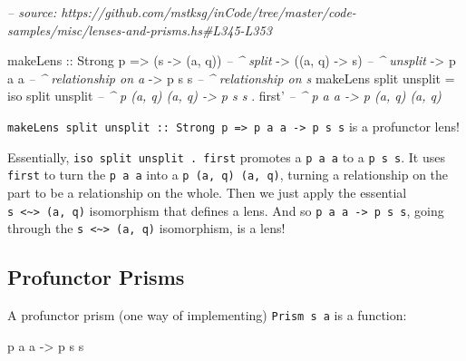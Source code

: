 \documentclass[]{article}
\newenvironment{Shaded}{}{}
\newcommand{\CommentTok}[1]{\textcolor[rgb]{0.38,0.63,0.69}{\textit{#1}}}
\newcommand{\DataTypeTok}[1]{\textcolor[rgb]{0.56,0.13,0.00}{#1}}
\newcommand{\FunctionTok}[1]{\textcolor[rgb]{0.02,0.16,0.49}{#1}}
\newcommand{\NormalTok}[1]{#1}
\newcommand{\OtherTok}[1]{\textcolor[rgb]{0.00,0.44,0.13}{#1}}
\begin{document}
\begin{Shaded}
\begin{Highlighting}[]
\CommentTok{-- source: https://github.com/mstksg/inCode/tree/master/code-samples/misc/lenses-and-prisms.hs#L345-L353}

\NormalTok{makeLens}
\OtherTok{    ::} \DataTypeTok{Strong}\NormalTok{ p}
    \OtherTok{=>}\NormalTok{ (s }\OtherTok{->}\NormalTok{ (a, q))        }\CommentTok{-- ^ split}
    \OtherTok{->}\NormalTok{ ((a, q) }\OtherTok{->}\NormalTok{ s)        }\CommentTok{-- ^ unsplit}
    \OtherTok{->}\NormalTok{ p a a                }\CommentTok{-- ^ relationship on a}
    \OtherTok{->}\NormalTok{ p s s                }\CommentTok{-- ^ relationship on s}
\NormalTok{makeLens split unsplit }\FunctionTok{=}
\NormalTok{    iso split unsplit  }\CommentTok{-- ^ p (a, q) (a, q) -> p s s}
  \FunctionTok{.}\NormalTok{ first'             }\CommentTok{-- ^ p a a -> p (a, q) (a, q)}
\end{Highlighting}
\end{Shaded}

\texttt{makeLens\ split\ unsplit\ ::\ Strong\ p\ =\textgreater{}\ p\ a\ a\ -\textgreater{}\ p\ s\ s}
is a profunctor lens!

Essentially, \texttt{iso\ split\ unsplit\ .\ first\textquotesingle{}} promotes a
\texttt{p\ a\ a} to a \texttt{p\ s\ s}. It uses \texttt{first\textquotesingle{}}
to turn the \texttt{p\ a\ a} into a \texttt{p\ (a,\ q)\ (a,\ q)}, turning a
relationship on the part to be a relationship on the whole. Then we just apply
the essential \texttt{s\ \textless{}\textasciitilde{}\textgreater{}\ (a,\ q)}
isomorphism that defines a lens. And so
\texttt{p\ a\ a\ -\textgreater{}\ p\ s\ s}, going through the
\texttt{s\ \textless{}\textasciitilde{}\textgreater{}\ (a,\ q)} isomorphism, is
a lens!

\hypertarget{profunctor-prisms}{%
\subsection{Profunctor Prisms}\label{profunctor-prisms}}

A profunctor prism (one way of implementing)
\texttt{Prism\textquotesingle{}\ s\ a} is a function:

\begin{Shaded}
\begin{Highlighting}[]
\NormalTok{p a a }\OtherTok{->}\NormalTok{ p s s}
\end{Highlighting}
\end{Shaded}
\end{document}
